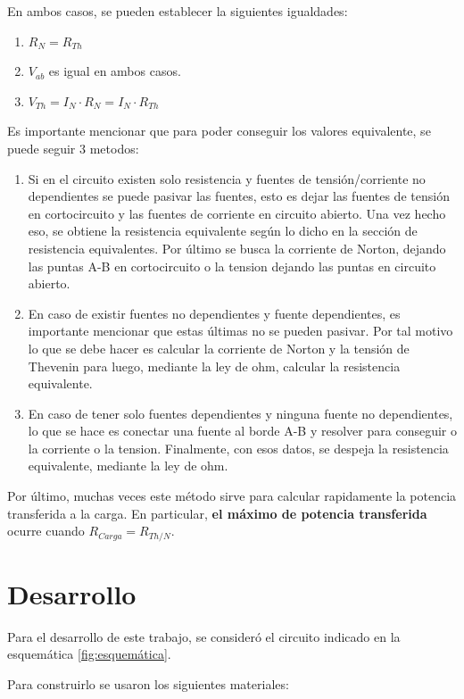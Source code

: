 \documentclass{article}
\begin{document}
        En ambos casos, se pueden establecer la siguientes igualdades:

        \begin{enumerate}
            \item $R_{N} = R_{Th}$
            \item $V_{ab}$ es igual en ambos casos.
            \item $V_{Th} = I_{N}\cdot R_{N} = I_{N}\cdot R_{Th}$
        \end{enumerate}

        Es importante mencionar que para poder conseguir los valores equivalente, se puede seguir 3 metodos:

        \begin{enumerate}
            \item Si en el circuito existen solo resistencia y fuentes de tensión/corriente no dependientes
                se puede pasivar las fuentes, esto es dejar las fuentes de tensión en cortocircuito y las fuentes de corriente en circuito abierto.
                Una vez hecho eso, se obtiene la resistencia equivalente según lo dicho en la sección de resistencia equivalentes.
                Por último se busca la corriente de Norton, dejando las puntas A-B en cortocircuito o la tension dejando las puntas en circuito abierto.
            \item En caso de existir fuentes no dependientes y fuente dependientes, es importante mencionar que estas últimas no se pueden pasivar. 
            Por tal motivo lo que se debe hacer es calcular la corriente de Norton y la tensión de Thevenin
                para luego, mediante la ley de ohm, calcular la resistencia equivalente.
            \item En caso de tener solo fuentes dependientes y ninguna fuente no dependientes, lo que se hace es conectar una fuente al borde A-B y resolver para conseguir o la corriente o la tension.
                Finalmente, con esos datos, se despeja la resistencia equivalente, mediante la ley de ohm.
        \end{enumerate}

        Por último, muchas veces este método sirve para calcular rapidamente la potencia transferida a la carga. En particular, \textbf{el máximo de potencia transferida} ocurre cuando $R_{\textit{Carga}} = R_{Th/N} $.



    \indent
    \section{Desarrollo}
        \quad Para el desarrollo de este trabajo, se consideró el circuito indicado en la esquemática \autoref{fig:esquemática}.\par
        Para construirlo se usaron los siguientes materiales:\par
        
\end{document}
